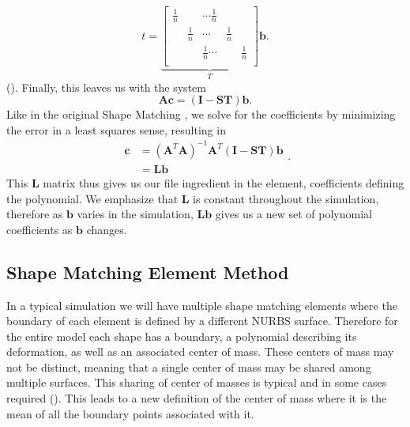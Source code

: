 \begin{equation}
\label{eqn:t_solution}
t = 
\underbrace{
\left[\begin{array}{ccccccc}
\frac{1}{n} & & \cdots \frac{1}{n} & & \\
& \frac{1}{n} & \cdots & \frac{1}{n} & \\
& & \frac{1}{n} \cdots & & \frac{1}{n} \\
\end{array} \right]}_{T} 
\mathbf{b}
\text{.}
\end{equation} (). Finally, this leaves us with the system
\begin{equation}
\mathbf{A}\mathbf{c}=(\mathbf{I}-\mathbf{ST})\mathbf{b}
\text{.}
\end{equation}
Like in the original Shape Matching \cite{10.1145/1073204.1073216}, we solve for the coefficients by minimizing the error in a least squares sense, resulting in
\begin{equation}
\label{eqn:c_one_element}
\begin{split}
\mathbf{c} & = (\mathbf{A}^T\mathbf{A})^{-1}\mathbf{A}^T(\mathbf{I-ST})\mathbf{b} \\
           & = \mathbf{L}\mathbf{b}
\end{split}
\text{.}
\end{equation}
This $\mathbf{L}$ matrix thus gives us our file ingredient in the element, coefficients defining the polynomial. We emphasize that $\mathbf{L}$ is constant throughout the simulation, therefore as $\mathbf{b}$ varies in the simulation, $\mathbf{Lb}$ gives us a new set of polynomial coefficients as $\mathbf{b}$ changes. 

\subsection{Shape Matching Element Method}
 In a typical simulation we will have multiple shape matching elements where the boundary of each element is defined by a different NURBS surface. Therefore for the entire model each shape has a boundary, a polynomial describing its deformation, as well as an associated center of mass. These centers of mass may not be distinct, meaning that a single center of mass may be shared among multiple surfaces. This sharing of center of masses is typical and in some cases required (). This leads to a new definition of the center of mass where it is the mean of all the boundary points associated with it.

